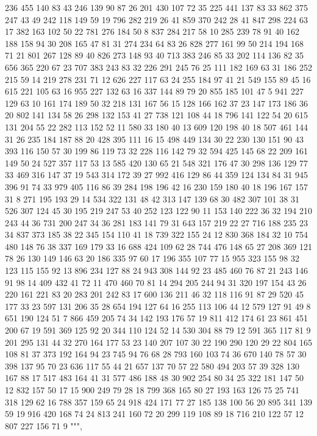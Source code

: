 \begin{pyverbatim}
{	236	455	140	83	43	246	139	90	87	26	201	430	107	72	35	225	441	137	83	33
	862	375	247	43	49	242	118	149	59	19	796	282	219	26	41	859	370	242	28	41
	847	298	224	63	17	382	163	102	50	22	781	276	184	50	8	837	284	217	58	10
	285	239	78	91	40	162	188	158	94	30	208	165	47	81	31	274	234	64	83	26
	828	277	161	99	50	214	194	168	71	21	801	267	128	89	40	826	273	148	93	40
	713	383	246	85	33	202	114	136	82	35	656	365	220	67	23	707	383	243	83	32
	226	291	245	76	25	111	182	169	63	31	186	252	215	59	14	219	278	231	71	12
	626	227	117	63	24	255	184	97	41	21	549	155	89	45	16	615	221	105	63	16
	955	227	132	63	16	337	144	89	79	20	855	185	101	47	5	941	227	129	63	10
	161	174	189	50	32	218	131	167	56	15	128	166	162	37	23	147	173	186	36	20
	802	141	134	58	26	298	132	153	41	27	738	121	108	44	18	796	141	122	54	20
	615	131	204	55	22	282	113	152	52	11	580	33	180	40	13	609	120	198	40	18
	507	461	144	31	26	235	184	187	88	20	428	395	111	16	15	498	449	134	30	22
	230	130	151	90	43	393	116	150	57	30	199	86	119	73	32	228	116	142	79	32
	594	425	145	68	22	209	161	149	50	24	527	357	117	53	13	585	420	130	65	21
	548	321	176	47	30	298	136	129	77	33	469	316	147	37	19	543	314	172	39	27
	992	416	129	86	44	359	124	134	84	31	945	396	91	74	33	979	405	116	86	39
	284	198	196	42	16	230	159	180	40	18	196	167	157	31	8	271	195	193	29	14
	534	322	131	48	42	313	147	139	68	30	482	307	101	38	31	526	307	124	45	30
	195	219	247	53	40	252	123	122	90	11	153	140	222	36	32	194	210	243	44	36
	731	200	247	34	36	281	183	141	79	31	643	157	219	22	27	716	188	235	23	34
	837	373	185	38	22	345	154	110	41	18	739	322	155	24	12	830	368	184	32	10
	754	480	148	76	38	337	169	179	33	16	688	424	109	62	28	744	476	148	65	27
	208	369	121	78	26	130	149	146	63	20	186	335	97	60	17	196	355	107	77	15
	955	323	155	98	32	123	115	155	92	13	896	234	127	88	24	943	308	144	92	23
	485	460	76	87	21	243	146	91	98	14	409	432	41	72	11	470	460	70	81	14
	294	205	244	94	31	320	197	154	43	26	220	161	221	83	20	283	201	242	83	17
	600	136	211	46	32	118	116	91	87	29	520	45	177	33	23	597	131	206	35	28
	654	194	127	64	16	255	113	106	44	12	579	127	91	49	8	651	190	124	51	7
	866	459	205	74	34	142	193	176	57	19	811	412	174	61	23	861	451	200	67	19
	591	369	125	92	20	344	110	124	52	14	530	304	88	79	12	591	365	117	81	9
	201	295	131	44	32	270	164	177	53	23	140	207	107	30	22	190	290	120	29	22
	804	165	108	81	37	373	192	164	94	23	745	94	76	68	28	793	160	103	74	36
	670	140	78	57	30	398	137	95	70	23	636	117	55	44	21	657	137	70	57	22
	580	494	203	57	39	328	130	167	88	17	517	483	164	41	31	577	486	188	48	30
	902	254	80	34	25	322	181	147	50	12	832	157	50	17	15	900	249	79	28	18
	799	368	165	80	27	193	163	126	75	25	741	318	129	62	16	788	357	159	65	24
	918	424	171	77	27	185	138	100	56	20	895	341	139	59	19	916	420	168	74	24
	813	241	160	72	20	299	119	108	89	18	716	210	122	57	12	807	227	156	71	9
	""",

}
\end{pyverbatim}
